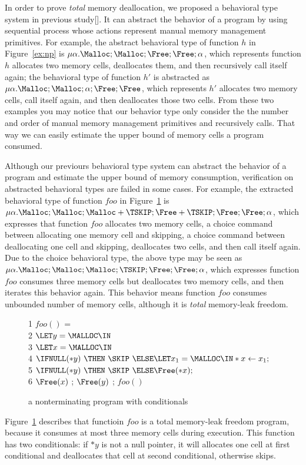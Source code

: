 In order to prove \emph{total} memory deallocation, we proposed a
behavioral type system in previous study[]. It can abstract the
behavior of a program by using sequential process whose actions
represent manual memory management primitives. For example, the
abstract behavioral type of function \(h\) in Figure~\ref{ex:np} is
\(\mu\alpha.\Malloc;\Malloc;\Free;\Free;\alpha\), which represents
function \(h\) allocates two memory cells, deallocates them, and then
recursively call itself again; the behavioral type of function \(h'\)
is abstracted as \(\mu\alpha.\Malloc;\Malloc;\alpha;\Free;\Free\),
which represents \(h'\) allocates two memory cells, call itself again,
and then deallocates those two cells. From these two examples you may
notice that our behavior type only consider the the number and order
of manual memory management primitives and recursively calls. That way
we can easily estimate the upper bound of memory cells a program
consumed.

Although our previours behavioral type system can abstract the
behavior of a program and estimate the upper bound of memory
consumption, verification on abstracted behavioral types are failed in
some cases. For example, the extracted behavioral type of function
\(foo\) in Figure~\ref{ex:np2} is \( \mu\alpha.\Malloc;\Malloc;\Malloc
+ \TSKIP;\Free + \TSKIP;\Free;\Free;\alpha \), which expresses that
function \(foo\) allocates two memory cells, a choice command between
allocating one memory cell and skipping, a choice command between
deallocating one cell and skipping, deallocates two cells, and then
call itself again. Due to the choice behavioral type, the above type
may be seen as \(
\mu\alpha.\Malloc;\Malloc;\Malloc;\TSKIP;\Free;\Free;\alpha \), which
expresses function \(foo\) consumes three memory cells but deallocates
two memory cells, and then iterates this behavior again. This behavior
means function \(foo\) consumes unbounded number of memory cells,
although it is \emph{total} memory-leak freedom.

\begin{exmp}\label{ex:ex2}
\begin{figure}[h]
1  \dtb $foo()$ =  \\
2    \dtb \dtb  $\LET y = \MALLOC \IN $ \\
3    \dtb \dtb  $\LET x = \MALLOC \IN $\\
4    \dtb \dtb  $\IFNULL(*y) \ \THEN \ \SKIP \ \ELSE \LET x_1 = \MALLOC \IN  *x \leftarrow x_1  ;$ \\
5   \dtb \dtb   $\IFNULL(*y) \ \THEN \ \SKIP \ \ELSE \Free(*x) ;$ \\
6   \dtb \dtb   $\Free(x)$ ; $\Free(y)$ ; $foo()$
\caption{a nonterminating program with conditionals}
\label{ex:np2}
\end{figure}
Figure~\ref{ex:np2} describes that functioin \(foo\) is a total
memory-leak freedom program, because it consumes at most three memory
cells during execution. This function has two conditionals: if \(*y\)
is not a null pointer, it will allocates one cell at first conditional
and deallocates that cell at second conditional, otherwise skips.
\end{exmp}

